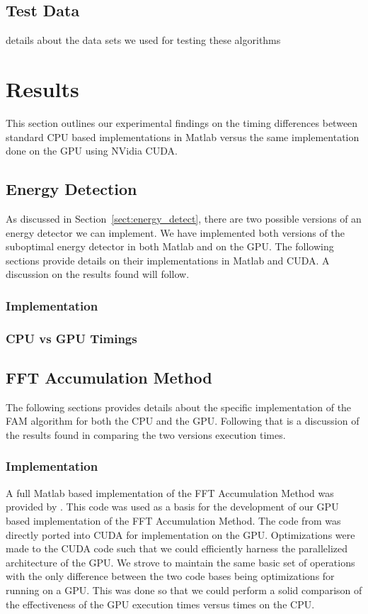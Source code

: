 \subsection{Test Data}
details about the data sets we used for testing these algorithms



\section{Results}
\label{sect:gpu_results}
This section outlines our experimental findings on the timing differences between standard CPU based implementations in Matlab versus the same implementation done on the GPU using NVidia CUDA.

\subsection{Energy Detection}
\label{sect:energy_detect_result}
As discussed in Section~\ref{sect:energy_detect}, there are two possible versions of an energy detector we can implement.  We have implemented both versions of the suboptimal energy detector in both Matlab and on the GPU.  The following sections provide details on their implementations in Matlab and CUDA.  A discussion on the results found will follow.

\subsubsection{Implementation}


\subsubsection{CPU vs GPU Timings}



\subsection{FFT Accumulation Method}
\label{sect:FAM_result}
The following sections provides details about the specific implementation of the FAM algorithm for both the CPU and the GPU.  Following that is a discussion of the results found in comparing the two versions execution times.

\subsubsection{Implementation}
A full Matlab based implementation of the FFT Accumulation Method was provided by \cite{Costa96}.  This code was used as a basis for the development of our GPU based implementation of the FFT Accumulation Method.  The code from \cite{Costa96} was directly ported into CUDA for implementation on the GPU.  Optimizations were made to the CUDA code such that we could efficiently harness the parallelized architecture of the GPU.  We strove to maintain the same basic set of operations with the only difference between the two code bases being optimizations for running on a GPU.  This was done so that we could perform a solid comparison of the effectiveness of the GPU execution times versus times on the CPU.

